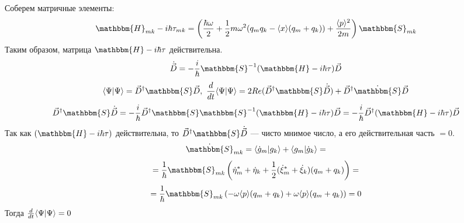Соберем матричные элементы:
$$\mathbbm{H}_{mk}-i\hbar\tau_{mk}=\left(\frac{\hbar\omega}{2}+\frac{1}{2}m\omega^2(q_mq_k-\langle x\rangle(q_m+q_k))+\frac{\langle p\rangle^2}{2m}\right)\mathbbm{S}_{mk}$$
Таким образом, матрица $\mathbbm{H}-i\hbar\tau$ действительна.
$$\dot{\vec{D}}=-\frac{i}{\hbar}\mathbbm{S}^{-1}(\mathbbm{H}-i\hbar\tau)\vec{D}$$
$$\myint{\Psi}{\Psi}=\vec{D}^{\dagger}\mathbbm{S}\vec{D},\ %
  \frac{d}{dt}\myint{\Psi}{\Psi}=2Re(\vec{D}^{\dagger}\mathbbm{S}\dot{\vec{D}})+\vec{D}^{\dagger}\dot{\mathbbm{S}}\vec{D}$$
$$\vec{D}^{\dagger}\mathbbm{S}\dot{\vec{D}}=%
  -\frac{i}{\hbar}\vec{D}^{\dagger}\mathbbm{S}\mathbbm{S}^{-1}(\mathbbm{H}-i\hbar\tau)\vec{D}=%
  -\frac{i}{\hbar}\vec{D}^{\dagger}(\mathbbm{H}-i\hbar\tau)\vec{D}$$
Так как $(\mathbbm{H}-i\hbar\tau)$ действительна, то $\vec{D}^{\dagger}\mathbbm{S}\dot{\vec{D}}$ --- чисто мнимое число, а его действительная часть $=0$.
$$\dot{\mathbbm{S}}_{mk}= \myint{\dot{g}_m}{g_k}+\myint{g_m}{\dot{g}_k}=$$
$$=\frac{1}{\hbar}\mathbbm{S}_{mk}\left(\dot{\eta}_m^*+\dot{\eta}_k+\frac{1}{2}(\dot{\xi}_m^*+\dot{\xi}_k)(q_m+q_k)\right)=$$
$$=\frac{1}{\hbar}\mathbbm{S}_{mk}\left(-\omega\langle p\rangle(q_m+q_k)+\omega\langle p\rangle(q_m+q_k)\right)=0$$
Тогда $\frac{d}{dt}\langle \Psi | \Psi \rangle = 0$

